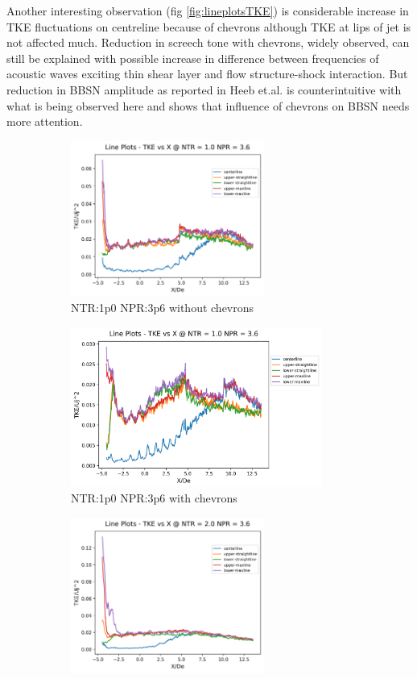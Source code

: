 Another interesting observation (fig \ref{fig:lineplotsTKE}) is considerable increase in TKE fluctuations on centreline because of chevrons although TKE at lips of jet is not affected much. Reduction in screech tone with chevrons, widely observed, can still be explained with possible increase in difference between frequencies of acoustic waves exciting thin shear layer and flow structure-shock interaction. But reduction in BBSN amplitude as reported in Heeb et.al.\cite{heeb} is counterintuitive with what is being observed here and shows that influence of chevrons on BBSN needs more attention. 

\begin{figure}[H]
\begin{subfigure}{.5\textwidth}
	\centering
	\includegraphics[width=2.5in]{images/LinePlots_TKE_NTR1p0_NPR3p6.png}
	\caption{NTR:1p0 NPR:3p6 without chevrons }
	\label{fig:lineplotsTKE1p03p6}
\end{subfigure}%
\begin{subfigure}{.5\textwidth}
	\centering
	\includegraphics[width=3.25in]{images/LinePlots_TKE_NTR1p0_NPR3p6c.png}
	\caption{NTR:1p0 NPR:3p6 with chevrons}
	\label{fig:lineplotsTKE1p03p6c}
\end{subfigure}
\begin{subfigure}{.5\textwidth}
	\centering
	\includegraphics[width=2.5in]{images/LinePlots_TKE_NTR2p0_NPR3p6.png}

\end{subfigure}
\end{figure}
